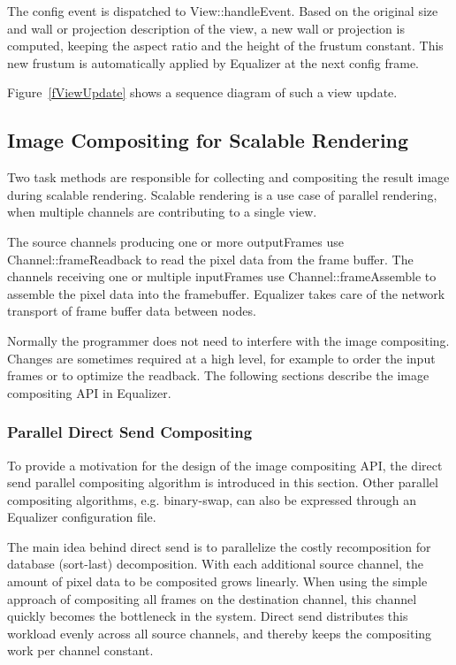 \documentclass[10pt,a4]{scrartcl}
\newcommand{\fig}[1]{Figure~\ref{#1}}
\begin{document}
The config event is dispatched to \textsf{View::handleEvent}. Based on
the original size and wall or projection description of the view, a new
wall or projection is computed, keeping the aspect ratio and the height
of the frustum constant. This new frustum is automatically applied by
Equalizer at the next config frame.

\fig{fViewUpdate} shows a sequence diagram of such a view update.

\subsection{\label{sCompositing}Image Compositing for Scalable Rendering}

Two task methods are responsible for collecting and compositing the
result image during scalable rendering. Scalable rendering is a use case
of parallel rendering, when multiple channels are contributing to a single
view. 

The source channels producing one or more \textsf{outputFrame}s use
\textsf{Channel::frame\-Read\-back} to read the pixel data from the frame
buffer. The channels receiving one or multiple \textsf{inputFrame}s use
\textsf{Channel::frameAssemb\-le} to assemble the pixel data into the
framebuffer. Equalizer takes care of the network transport of frame
buffer data between nodes.

Normally the programmer does not need to interfere with the image
compositing. Changes are sometimes required at a high level, for example
to order the input frames or to optimize the readback. The following
sections describe the image compositing API in Equalizer.

\subsubsection{\label{sDirectSend}Parallel Direct Send Compositing}

To provide a motivation for the design of the image compositing
API, the direct send parallel compositing algorithm is introduced in this
section. Other parallel compositing algorithms, e.g. binary-swap, can
also be expressed through an Equalizer configuration file.

The main idea behind direct send is to parallelize the costly
recomposition for database (sort-last) decomposition. With each
additional source channel, the amount of pixel data to be composited
grows linearly. When using the simple approach of compositing all frames
on the destination channel, this channel quickly becomes the bottleneck
in the system. Direct send distributes this workload evenly across all
source channels, and thereby keeps the compositing work per channel
constant.
\end{document}
